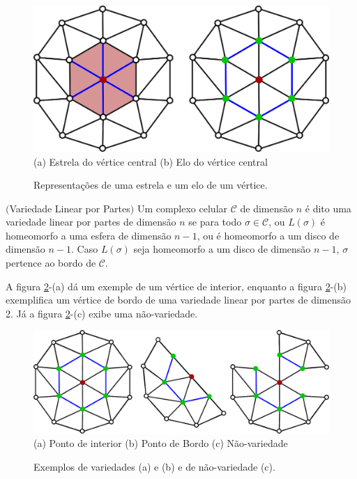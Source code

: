 \begin{figure}[h]
\begin{center} 
\includegraphics[angle=0,scale=0.3]{imagens/cap2/fig4.eps}\\
(a) Estrela do vértice central \hspace{1.0cm} (b) Elo do vértice central\\
\caption{Representações de uma estrela e um elo de um vértice.} 
\label{fig.elo}
\end{center}
\end{figure}


\begin{defi} $($Variedade Linear por Partes$)$
Um complexo celular $\mathcal{C}$ de dimensão $n$ é dito uma variedade linear por partes de dimensão $n$ se para todo $\sigma \in \mathcal{C}$, ou $L(\sigma)$ é homeomorfo a uma esfera de dimensão $n-1$, ou é homeomorfo a um disco de dimensão $n-1$. 
Caso $L(\sigma)$ seja homeomorfo a um disco de dimensão $n-1$, $\sigma$ pertence ao bordo de $\mathcal{C}$. 
\end{defi}


A figura \ref{fig.varLinPartes}-(a) dá um exemple de um vértice de interior, enquanto a figura \ref{fig.varLinPartes}-(b) exemplifica um vértice de bordo de uma variedade linear por partes de dimensão 2. 
Já a figura \ref{fig.varLinPartes}-(c) exibe uma não-variedade. 

\begin{figure}[h]
\begin{center} 
\includegraphics[angle=0,scale=0.3]{imagens/cap2/fig5.eps}\\
(a) Ponto de interior \hspace{0.8cm} (b) Ponto de Bordo \hspace{0.8cm} (c) Não-variedade
\caption{Exemplos de variedades (a) e (b) e de não-variedade (c).} 
\label{fig.varLinPartes}
\end{center}
\end{figure}

